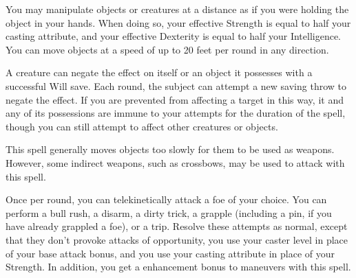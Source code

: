 \spellrng{\rngmed}
\begin{spelleffect}
  You may manipulate objects or creatures at a distance as if you were holding the object in your hands. When doing so, your effective Strength is equal to half your casting attribute, and your effective Dexterity is equal to half your Intelligence. You can move objects at a speed of up to 20 feet per round in any direction.

   A creature can negate the effect on itself or an object it possesses with a successful Will save. Each round, the subject can attempt a new saving throw to negate the effect. If you are prevented from affecting a target in this way, it and any of its possessions are immune to your attempts for the duration of the spell, though you can still attempt to affect other creatures or objects. 
\end{spelleffect}
\begin{spellnotes}
  This spell generally moves objects too slowly for them to be used as weapons. However, some indirect weapons, such as crossbows, may be used to attack with this spell. 
\end{spellnotes}

\spellrng{\rngmed}
\begin{spelleffect}
  Once per round, you can telekinetically attack a foe of your choice. You can perform a bull rush, a disarm, a dirty trick, a grapple (including a pin, if you have already grappled a foe), or a trip. Resolve these attempts as normal, except that they don't provoke attacks of opportunity, you use your caster level in place of your base attack bonus, and you use your casting attribute in place of your Strength. In addition, you get a  enhancement bonus to maneuvers with this spell. \bonusscalingdescription
\end{spelleffect}

